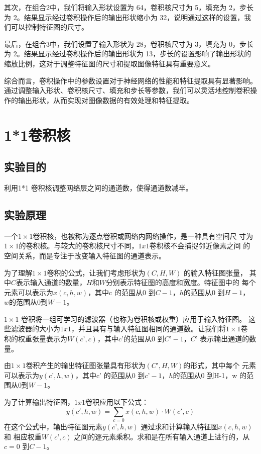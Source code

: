 \documentclass[a4paper,12pt]{article}
\begin{document}
其次，在组合2中，我们将输入形状设置为 64，卷积核尺寸为 5，填充为 2，步长为 2。结果显示经过卷积操作后的输出形状缩小为 32，说明通过这样的设置，我们可以控制特征图的尺寸。

最后，在组合3中，我们设置了输入形状为 28，卷积核尺寸为 3，填充为 0，步长为 2。结果显示经过卷积操作后的输出形状为 13，步长的设置影响了输出形状的缩放比例，这对于调整特征图的尺寸和提取图像特征具有重要意义。

综合而言，卷积操作中的参数设置对于神经网络的性能和特征提取具有显著影响。通过调整输入形状、卷积核尺寸、填充和步长等参数，我们可以灵活地控制卷积操作的输出形状，从而实现对图像数据的有效处理和特征提取。

\newpage
\section{1*1卷积核}
\subsection{实验目的}
利用1*1 卷积核调整网络层之间的通道数，使得通道数减半。

\subsection{实验原理}
一个$1 \times 1$卷积核，也被称为逐点卷积或网络内网络操作，是一种具有空间尺
寸为$1 \times 1$的卷积核。与较大的卷积核尺寸不同，$1x1$卷积核不会捕捉邻近像素之间
的空间关系，而是专注于改变输入特征图的通道表示。

为了理解$1 \times 1$卷积的公式，让我们考虑形状为$(C, H, W)$ 的输入特征图张量，
其中$C $表示输入通道的数量，$H $和$W $分别表示特征图的高度和宽度。特征图中的
每个元素可以表示为$x(c, h, w)$，其中c 的范围从0 到$C-1$，$h$的范围从$0$ 到$H-1$，
$w $的范围从$0 $到$W-1$。

$1 \times 1$ 卷积将一组可学习的滤波器（也称为卷积核或权重）应用于输入特征图。
这些滤波器的大小为$1x1$，并且具有与输入特征图相同的通道数。让我们将$1 \times 1$卷
积的权重张量表示为$W(c’, c)$，其中$c’ $的范围从0 到$C’-1$，$C’$ 表示输出通道的数
量。

由$1 \times 1$卷积产生的输出特征图张量具有形状为$(C’, H, W) $的形式，其中每个
元素可以表示为$y(c’, h, w)$，其中c’ 的范围从0 到$c’-1$，$h $的范围从0 到H-1，w
的范围从$0 $到$W-1$。

为了计算输出特征图，$1x1 $卷积应用以下公式：
\begin{equation}
y(c', h, w) = \sum_{c=0} x(c, h, w) \cdot W(c', c)
\end{equation}
在这个公式中，输出特征图元素$y(c’, h, w)$ 通过求和计算输入特征图$x(c, h, w)$ 和
相应权重$W(c’, c)$ 之间的逐元素乘积。求和是在所有输入通道上进行的，从$c=0$
到$C-1$。
\end{document}
